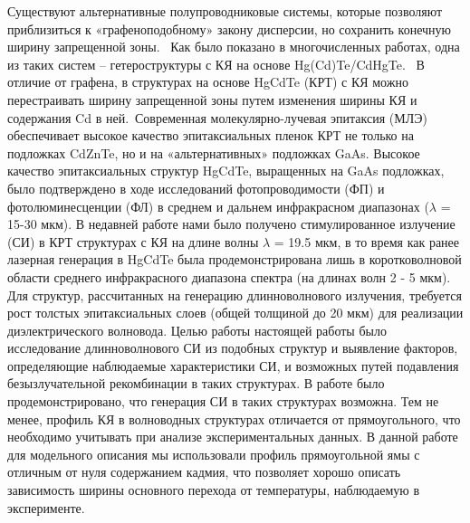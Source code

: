 Существуют альтернативные полупроводниковые системы, которые позволяют
         приблизиться к «графеноподобному» закону дисперсии, но сохранить конечную ширину запрещенной зоны. 
         Как было показано в многочисленных работах, одна из таких систем -- гетероструктуры с КЯ на основе Hg(Cd)Te/CdHgTe. 
         В отличие от графена, в структурах на основе HgCdTe (КРТ) с КЯ можно перестраивать ширину запрещенной зоны путем изменения ширины КЯ и 
         содержания Cd в ней. Современная молекулярно-лучевая эпитаксия (МЛЭ) обеспечивает высокое качество эпитаксиальных пленок КРТ не только на подложках CdZnTe, 
         но и на «альтернативных» подложках GaAs. Высокое качество эпитаксиальных структур HgCdTe, выращенных на GaAs подложках, было подтверждено в ходе исследований 
         фотопроводимости (ФП) и фотолюминесценции (ФЛ) в среднем и дальнем инфракрасном диапазонах ($λ$ = 15-30 мкм). В недавней работе нами было получено 
         стимулированное излучение (СИ) в КРТ структурах с КЯ на длине волны $λ$ = 19.5 мкм, в то время как ранее лазерная генерация в HgCdTe была 
         продемонстрирована лишь в коротковолновой области среднего инфракрасного диапазона спектра (на длинах волн 2 - 5 мкм). 
Для структур, рассчитанных на генерацию длинноволнового излучения, требуется рост толстых эпитаксиальных слоев (общей толщиной до 20 мкм) для реализации диэлектрического волновода. 
Целью работы настоящей работы было исследование длинноволнового СИ из подобных структур и выявление факторов, определяющие наблюдаемые характеристики СИ, и возможных путей подавления 
безызлучательной рекомбинации в таких структурах. В работе было продемонстрировано, что генерация СИ в таких структурах возможна. Тем не менее, профиль КЯ в волноводных 
структурах отличается от прямоугольного, что необходимо учитывать при анализе экспериментальных данных. В данной работе для модельного описания мы использовали профиль прямоугольной 
ямы с отличным от нуля содержанием кадмия, что позволяет хорошо описать зависимость ширины основного перехода от температуры, наблюдаемую в эксперименте. 
\newpage

